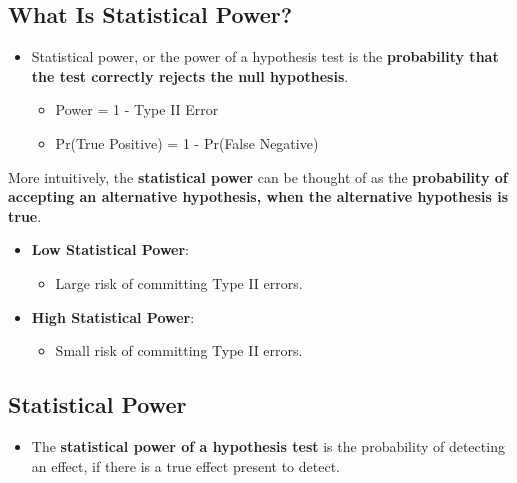 \documentclass[10pt,article]{article}
\begin{document}
\subsection{What Is Statistical Power?}
\label{sec:org4aa735d}
\begin{itemize}
\item {\color{green}Statistical power}, or the power of a hypothesis test is the \textbf{probability that the test correctly rejects the null hypothesis}.
\begin{itemize}
\item Power = 1 - Type II Error
\item Pr(True Positive) = 1 - Pr(False Negative)
\end{itemize}
\end{itemize}
More intuitively, the \textbf{statistical power} can be thought of as the \textbf{probability of accepting an alternative hypothesis, when the alternative hypothesis is true}.
\begin{itemize}
\item \textbf{Low Statistical Power}:
\begin{itemize}
\item Large risk of committing Type II errors.
\end{itemize}
\item \textbf{High Statistical Power}:
\begin{itemize}
\item Small risk of committing Type II errors.
\end{itemize}
\end{itemize}

\subsection{Statistical Power}
\label{sec:org72f27df}
\begin{itemize}
\item The \textbf{statistical power of a hypothesis test} is the {\color{green}probability of detecting an effect, if there is a true effect present to detect}.
\end{itemize}
\end{document}
